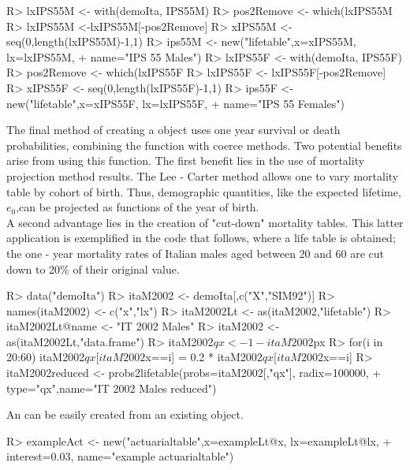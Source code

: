 \documentclass[nojss]{jss}
\begin{document}
\begin{Schunk}
\begin{Sinput}
R> lxIPS55M <- with(demoIta, IPS55M)
R> pos2Remove <- which(lxIPS55M %
R> lxIPS55M <-lxIPS55M[-pos2Remove]
R> xIPS55M <-seq(0,length(lxIPS55M)-1,1)
R> ips55M <- new("lifetable",x=xIPS55M, lx=lxIPS55M, 
+  		name="IPS 55 Males")
R> lxIPS55F <- with(demoIta, IPS55F)
R> pos2Remove <- which(lxIPS55F %
R> lxIPS55F <- lxIPS55F[-pos2Remove]
R> xIPS55F <- seq(0,length(lxIPS55F)-1,1)
R> ips55F <- new("lifetable",x=xIPS55F, lx=lxIPS55F, 
+  		name="IPS 55 Females")
\end{Sinput}
\end{Schunk}


The final method of creating a  object uses 
one year survival or death probabilities, combining the  function with 
 coerce methods. Two potential benefits arise from using this function. The first benefit lies in the use of mortality projection method
results. The Lee - Carter method \citep{Lee1992} allows one to vary mortality table
by cohort of birth.
Thus, demographic quantities, like the expected lifetime, $e_0$,can be projected as functions of the year of birth.\\
A second advantage lies in the creation of "cut-down" mortality tables. This latter
application is exemplified in the code that follows, where a  life
table is obtained; the one - year mortality rates of Italian males aged between 20 and 60 are cut down to 20\% of their original value.

\begin{Schunk}
\begin{Sinput}
R> data("demoIta")
R> itaM2002 <- demoIta[,c("X","SIM92")]
R> names(itaM2002) <- c("x","lx")
R> itaM2002Lt <- as(itaM2002,"lifetable")
R> itaM2002Lt@name <- "IT 2002 Males"
R> itaM2002 <- as(itaM2002Lt,"data.frame")
R> itaM2002$qx <- 1-itaM2002$px
R> for(i in 20:60) itaM2002$qx[itaM2002$x==i] = 0.2 * itaM2002$qx[itaM2002$x==i]
R> itaM2002reduced <- probs2lifetable(probs=itaM2002[,"qx"], radix=100000,
+  		type="qx",name="IT 2002 Males reduced")
\end{Sinput}
\end{Schunk}


An  can be easily created from an existing  object.

\begin{Schunk}
\begin{Sinput}
R> exampleAct <- new("actuarialtable",x=exampleLt@x, lx=exampleLt@lx, 
+  interest=0.03, name="example actuarialtable")
\end{Sinput}
\end{Schunk}
\end{document}

